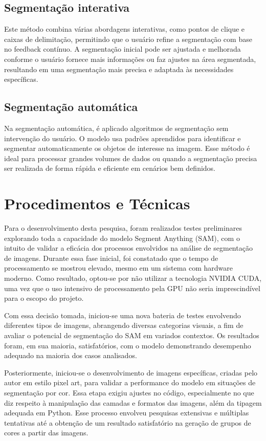 \subsection{Segmentação interativa}
Este método combina várias abordagens interativas, como pontos de clique e caixas de delimitação, permitindo que o usuário refine a segmentação com base no feedback contínuo. 
A segmentação inicial pode ser ajustada e melhorada conforme o usuário fornece mais informações ou faz ajustes na área segmentada, resultando em uma segmentação mais precisa e adaptada às necessidades específicas.


\subsection{Segmentação automática}
Na segmentação automática, é aplicado algoritmos de segmentação sem intervenção do usuário. 
O modelo usa padrões aprendidos para identificar e segmentar automaticamente os objetos de interesse na imagem. 
Esse método é ideal para processar grandes volumes de dados ou quando a segmentação precisa ser realizada de forma rápida e eficiente em cenários bem definidos.

\section{Procedimentos e Técnicas}

Para o desenvolvimento desta pesquisa, foram realizados testes preliminares explorando toda a capacidade do modelo Segment Anything (SAM), com o intuito de validar a eficácia dos processos envolvidos na análise de segmentação de imagens. Durante essa fase inicial, foi constatado que o tempo de processamento se mostrou elevado, mesmo em um sistema com hardware moderno. Como resultado, optou-se por não utilizar a tecnologia NVIDIA CUDA, uma vez que o uso intensivo de processamento pela GPU não seria imprescindível para o escopo do projeto.

Com essa decisão tomada, iniciou-se uma nova bateria de testes envolvendo diferentes tipos de imagens, abrangendo diversas categorias visuais, a fim de avaliar o potencial de segmentação do SAM em variados contextos. Os resultados foram, em sua maioria, satisfatórios, com o modelo demonstrando desempenho adequado na maioria dos casos analisados.

Posteriormente, iniciou-se o desenvolvimento de imagens específicas, criadas pelo autor em estilo pixel art, para validar a performance do modelo em situações de segmentação por cor. Essa etapa exigiu ajustes no código, especialmente no que diz respeito à manipulação das camadas e formatos das imagens, além da tipagem adequada em Python. Esse processo envolveu pesquisas extensivas e múltiplas tentativas até a obtenção de um resultado satisfatório na geração de grupos de cores a partir das imagens.

